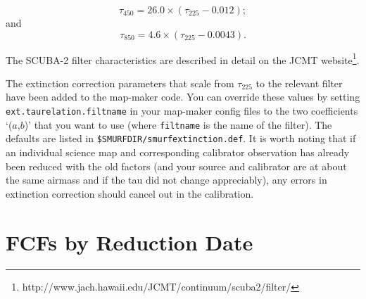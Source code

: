 \documentclass[twoside,11pt]{article}
\newcommand{\htmladdnormallinkfoot}[2]{#1\footnote{#2}}
\newcommand{\xlabel}[1]{}
\renewcommand{\_}{\texttt{\symbol{95}}}
\newcommand{\param}[1]{\texttt{#1}}
\begin{document}
\begin{equation}
\tau_{450} = 26.0 \times (\tau_{225} - 0.012);
\end{equation}
and
\begin{equation}
\tau_{850} = 4.6 \times (\tau_{225} - 0.0043).
\end{equation}

The SCUBA-2 filter characteristics are described in
detail \htmladdnormallinkfoot{on the JCMT
website}{http://www.jach.hawaii.edu/JCMT/continuum/scuba2/filter/}.

The extinction correction parameters that scale from $\tau_{225}$ to
the relevant filter have been added to the map-maker code. You can
override these values by setting \param{ext.taurelation.filtname} in
your map-maker config files to the two coefficients `($a$,$b$)' that you
want to use (where \texttt{filtname} is the name of the filter). The
defaults are listed in \texttt{\$SMURF\_DIR/smurf\_extinction.def}.
It is worth noting that if an
individual science map and corresponding calibrator observation has
already been reduced with the old factors (and your source and
calibrator are at about the same airmass and if the tau did not change
appreciably), any errors in extinction correction should cancel out in
the calibration.


\section{\xlabel{fcfsred}FCFs by Reduction Date}
\label{app:fcfs}
\end{document}
